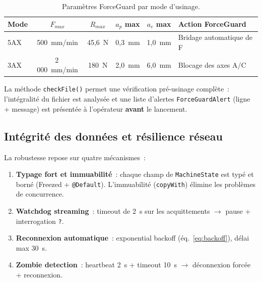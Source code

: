 \documentclass[12pt,a4paper]{report}
\newcommand{\code}[1]{\texttt{\small #1}}
\begin{document}
\begin{table}[H]
\centering
\caption{Paramètres ForceGuard par mode d'usinage.}
\label{tab:forceguard}
\begin{tabular}{l c c c c l}
\toprule
Mode & $F_{max}$ & $R_{max}$ & $a_p$ max & $a_e$ max & Action ForceGuard \\
\midrule
\rowcolor{blue!5}
5AX & 500~mm/min & 45,6~N & 0,3~mm & 1,0~mm & Bridage automatique de F \\
\rowcolor{orange!5}
3AX & 2\,000~mm/min & 180~N & 2,0~mm & 6,0~mm & Blocage des axes A/C \\
\bottomrule
\end{tabular}
\end{table}

La méthode \code{checkFile()} permet une vérification pré-usinage complète~: l'intégralité du fichier est analysée et une liste d'alertes \code{ForceGuardAlert} (ligne + message) est présentée à l'opérateur \textbf{avant} le lancement.

\subsection{Intégrité des données et résilience réseau}

La robustesse repose sur quatre mécanismes~:

\begin{enumerate}
  \item \textbf{Typage fort et immuabilité}~: chaque champ de \code{MachineState} est typé et borné (Freezed + \code{@Default}). L'immuabilité (\code{copyWith}) élimine les problèmes de concurrence.
  \item \textbf{Watchdog streaming}~: timeout de 2~s sur les acquittements $\rightarrow$ pause + interrogation \code{?}.
  \item \textbf{Reconnexion automatique}~: exponential backoff (éq.~\ref{eq:backoff}), délai max 30~s.
  \item \textbf{Zombie detection}~: heartbeat 2~s + timeout 10~s $\rightarrow$ déconnexion forcée + reconnexion.
\end{enumerate}
\end{document}

